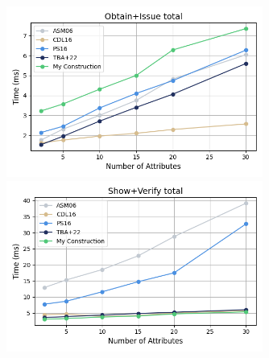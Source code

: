 \begin{figure}
    \centering
    \begin{minipage}{\textwidth}
        \centering
        \includegraphics[width=0.75\textwidth]{figures/chap2_anoncreds_obtain_issue.png}
    \end{minipage}
    
    \vspace{0.05cm}
    
    \begin{minipage}{\textwidth}
        \centering
        \includegraphics[width=0.75\textwidth]{figures/chap2_anoncreds_show_verify.png}
    \end{minipage}
    
    \vspace{0.05cm}
    

\end{figure}
